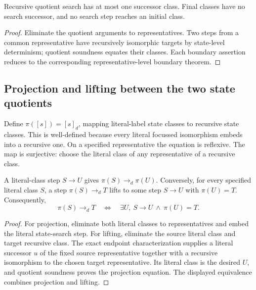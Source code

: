 \begin{theorem}
Recursive quotient search has at most one successor class. Final classes have
no search successor, and no search step reaches an initial class.
\end{theorem}
\begin{proof}
Eliminate the quotient arguments to representatives. Two steps from a common
representative have recursively isomorphic targets by state-level determinism;
quotient soundness equates their classes. Each boundary assertion reduces to
the corresponding representative-level boundary theorem.
\end{proof}

\subsection{Projection and lifting between the two state quotients}
\begin{definition}
Define $\pi([s])=[s]_d$, mapping literal-label state classes to recursive state
classes. This is well-defined because every literal focussed isomorphism
embeds into a recursive one. On a specified representative the equation is
reflexive. The map is surjective: choose the literal class of any representative
of a recursive class.
\end{definition}

\begin{theorem}
A literal-class step $S\longrightarrow U$ gives
$\pi(S)\longrightarrow_d\pi(U)$. Conversely, for every specified literal
class $S$, a step $\pi(S)\longrightarrow_d T$ lifts to some step
$S\longrightarrow U$ with $\pi(U)=T$. Consequently,
\[
 \pi(S)\longrightarrow_d T\quad\Longleftrightarrow\quad
 \exists U,\ S\longrightarrow U\ \land\ \pi(U)=T.
\]
\end{theorem}
\begin{proof}
For projection, eliminate both literal classes to representatives and embed
the literal state-search step. For lifting, eliminate the source literal class
and target recursive class. The exact endpoint characterization supplies a
literal successor $u$ of the fixed source representative together with a
recursive isomorphism to the chosen target representative. Its literal class
is the desired $U$, and quotient soundness proves the projection equation.
The displayed equivalence combines projection and lifting.
\end{proof}

